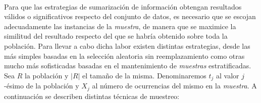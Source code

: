 \documentclass{subfiles}
\begin{document}
        \paragraph{}
        Para que las estrategias de sumarización de información obtengan resultados válidos o significativos respecto del conjunto de datos, es necesario que se escojan adecuadamente las instancias de la \emph{muestra}, de manera que se maximice la similitud del resultado respecto del que se habría obtenido sobre toda la población. Para llevar a cabo dicha labor existen distintas estrategias, desde las más simples basadas en la selección aleatoria sin reemplazamiento como otras mucho más sofisticadas basadas en el mantenimiento de \emph{muestras} estratificadas. Sea $R$ la población y $|R|$ el tamaño de la misma. Denominaremos $t_j$ al valor $j$-ésimo de la población y $X_j$ al número de ocurrencias del mismo en la \emph{muestra}. A continuación se describen distintas técnicas de muestreo:
\end{document}
